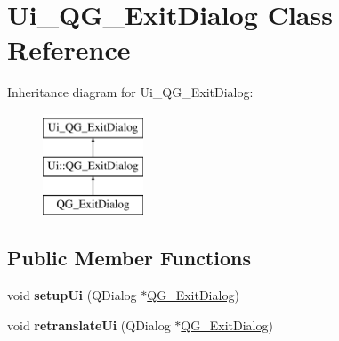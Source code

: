 \hypertarget{classUi__QG__ExitDialog}{\section{Ui\-\_\-\-Q\-G\-\_\-\-Exit\-Dialog Class Reference}
\label{classUi__QG__ExitDialog}
}
Inheritance diagram for Ui\-\_\-\-Q\-G\-\_\-\-Exit\-Dialog\-:\begin{figure}[H]
\begin{center}
\leavevmode
\includegraphics[height=3.000000cm]{classUi__QG__ExitDialog}
\end{center}
\end{figure}
\subsection*{Public Member Functions}
\begin{DoxyCompactItemize}
\item 
\hypertarget{classUi__QG__ExitDialog_ac20c2eb335e8a3904f2f46eb8f6ec83a}{void {\bfseries setup\-Ui} (Q\-Dialog $\ast$\hyperlink{classQG__ExitDialog}{Q\-G\-\_\-\-Exit\-Dialog})}\label{classUi__QG__ExitDialog_ac20c2eb335e8a3904f2f46eb8f6ec83a}

\item 
\hypertarget{classUi__QG__ExitDialog_afe0c2f87170f6310fb0e27c9e402c308}{void {\bfseries retranslate\-Ui} (Q\-Dialog $\ast$\hyperlink{classQG__ExitDialog}{Q\-G\-\_\-\-Exit\-Dialog})}\label{classUi__QG__ExitDialog_afe0c2f87170f6310fb0e27c9e402c308}

\end{DoxyCompactItemize}
